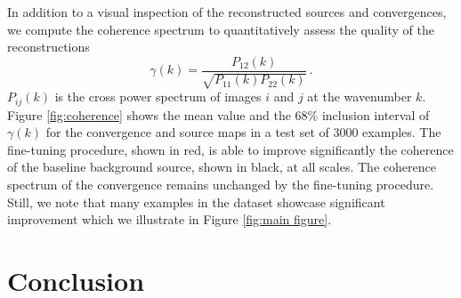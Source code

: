 In addition to a visual inspection of the reconstructed sources 
and convergences, we compute 
the coherence spectrum to quantitatively assess the quality of the reconstructions
\begin{equation}\label{eq:coherence} 
        \gamma(k) = \frac{P_{12}(k)}{\sqrt{P_{11}(k) P_{22}(k)}} \, .
\end{equation}
$P_{ij}(k)$ is the cross power spectrum of images $i$ and $j$ at 
the wavenumber $k$. Figure \ref{fig:coherence} shows the mean value and the $68\%$ inclusion interval of $\gamma(k)$ 
for the convergence and source maps in a test set of 3000 examples. 
The fine-tuning 
procedure, shown in red, is able to improve significantly the coherence of the baseline background 
source, shown in black, at all scales. 
The coherence spectrum of the convergence remains unchanged by the fine-tuning procedure.
Still, we note that many examples in the dataset showcase significant 
improvement which we illustrate in Figure \ref{fig:main figure}.




\section{Conclusion}\label{sec:conclusion}

